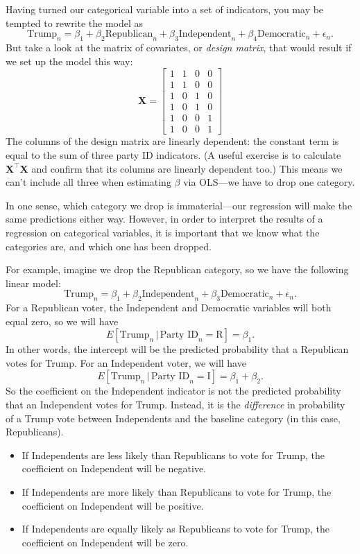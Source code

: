 \documentclass[12pt,oneside,openany]{book}
\begin{document}
Having turned our categorical variable into a set of indicators, you may
be tempted to rewrite the model as \[
\text{Trump}_n = \beta_1 + \beta_2 \text{Republican}_n + \beta_3 \text{Independent}_n + \beta_4 \text{Democratic}_n + \epsilon_n.
\] But take a look at the matrix of covariates, or \emph{design matrix},
that would result if we set up the model this way: \[
\mathbf{X} = \begin{bmatrix}
  1 & 1 & 0 & 0 \\
  1 & 1 & 0 & 0 \\
  1 & 0 & 1 & 0 \\
  1 & 0 & 1 & 0 \\
  1 & 0 & 0 & 1 \\
  1 & 0 & 0 & 1
\end{bmatrix}
\] The columns of the design matrix are linearly dependent: the constant
term is equal to the sum of three party ID indicators. (A useful
exercise is to calculate \(\mathbf{X}^\top \mathbf{X}\) and confirm that
its columns are linearly dependent too.) This means we can't include all
three when estimating \(\beta\) via OLS---we have to drop one category.

In one sense, which category we drop is immaterial---our regression will
make the same predictions either way. However, in order to interpret the
results of a regression on categorical variables, it is important that
we know what the categories are, and which one has been dropped.

For example, imagine we drop the Republican category, so we have the
following linear model: \[
\text{Trump}_n = \beta_1 + \beta_2 \text{Independent}_n + \beta_3 \text{Democratic}_n + \epsilon_n.
\] For a Republican voter, the Independent and Democratic variables will
both equal zero, so we will have \[
E[\text{Trump}_n \,|\, \text{Party ID}_n = \text{R}] = \beta_1.
\] In other words, the intercept will be the predicted probability that
a Republican votes for Trump. For an Independent voter, we will have \[
E[\text{Trump}_n \,|\, \text{Party ID}_n = \text{I}] = \beta_1 + \beta_2.
\] So the coefficient on the Independent indicator is not the predicted
probability that an Independent votes for Trump. Instead, it is the
\emph{difference} in probability of a Trump vote between Independents
and the baseline category (in this case, Republicans).

\begin{itemize}
\item
  If Independents are less likely than Republicans to vote for Trump,
  the coefficient on Independent will be negative.
\item
  If Independents are more likely than Republicans to vote for Trump,
  the coefficient on Independent will be positive.
\item
  If Independents are equally likely as Republicans to vote for Trump,
  the coefficient on Independent will be zero.
\end{itemize}
\end{document}
